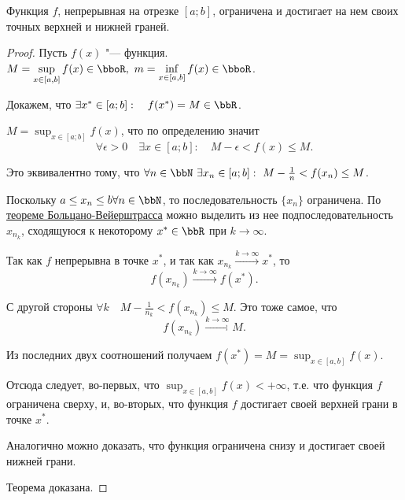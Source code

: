 \begin{thm}  \label{th:ch2:Veyershtrass}
Функция $f$, непрерывная на отрезке $[a;b]$, ограничена и достигает на нем своих точных верхней и нижней граней.
\end{thm}
\begin{proof}\leavevmode

Пусть $f(x)$ "--- функция. $M = \sup_{x \in [a,b]}\limits f(x) \in \bboR,\  m = \inf_{x \in [a,b]}\limits f(x) \in \bboR$.

Докажем, что $\exists x^* \in [a;b]:\quad f(x^*)= M \in \bbR$.
\smallskip

$M = \sup_{x \in [a;b]}\limits f(x)$, что по определению значит 
$$
\forall\epsilon > 0\quad \exists x\in [a;b]:\quad M-\epsilon < f(x) \le M. 
$$ 

Это эквивалентно тому, что $\forall n \in \bbN\ \exists x_n \in [a;b]:\ M-\frac{1}{n} < f(x_n) \le M $.

Поскольку $ a\le x_n \le b \forall n \in \bbN$, то последовательность $\{x_n\}$ ограничена. По \hyperref[th:ch1:TBV]{теореме Больцано-Вейерштрасса} можно выделить из нее подпоследовательность ${x_{n_k}}$, сходящуюся к некоторому $x^* \in \bbR$ при $k \to \infty$.

Так как $f$ непрерывна в точке $x^*$, и так как $x_{n_k}\xrightarrow{k \to \infty} x^*$, то  
$$
f(x_{n_k}) \xrightarrow{k \to \infty} f(x^*).
$$ 

С другой стороны $\forall k \quad M-\frac{1}{n_k} < f(x_{n_k}) \le M$. Это тоже самое, что
$$
f(x_{n_k}) \xrightarrow{k \to \infty} M.
$$

Из последних двух соотношений получаем $f(x^*) = M = \sup_{x \in [a,b]}\limits f(x) $. 

Отсюда следует, во-первых, что  $\sup_{x \in [a,b]}\limits f(x)<+\infty$, т.е. что функция $f$ ограничена сверху, и, во-вторых, что функция $f$ достигает своей верхней грани в точке $x^*$.

Аналогично можно доказать, что функция ограничена снизу и достигает своей нижней грани.

Теорема доказана.   
\end{proof}